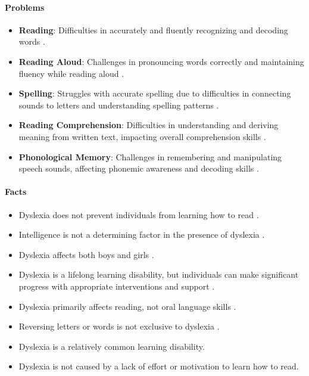 \paragraph{\textbf{Problems}}
\begin{itemize}
    \item \textbf{Reading}: Difficulties in accurately and fluently recognizing and decoding words \cite{dyslexiaCharAndSigns}.
    \item \textbf{Reading Aloud}: Challenges in pronouncing words correctly and maintaining fluency while reading aloud \cite{dyslexiaCharAndSigns}.
    \item \textbf{Spelling}: Struggles with accurate spelling due to difficulties in connecting sounds to letters and understanding spelling patterns \cite{dyslexiaCharAndSigns}.
    \item \textbf{Reading Comprehension}: Difficulties in understanding and deriving meaning from written text, impacting overall comprehension skills \cite{dyslexiaCharAndSigns}.
    \item \textbf{Phonological Memory}: Challenges in remembering and manipulating speech sounds, affecting phonemic awareness and decoding skills \cite{dyslexiaCharAndSigns}.
\end{itemize}

\paragraph{\textbf{Facts}}
\begin{itemize}
    \item Dyslexia does not prevent individuals from learning how to read \cite{dyslexiaCharAndSigns}.
    \item Intelligence is not a determining factor in the presence of dyslexia \cite{dyslexiaStatistics}. 
    \item Dyslexia affects both boys and girls \cite{dyslexiaCharAndSigns}.
    \item Dyslexia is a lifelong learning disability, but individuals can make significant progress with appropriate interventions and support \cite{dyslexiaCharAndSigns}.
    \item Dyslexia primarily affects reading, not oral language skills \cite{dyslexiaCharAndSigns}.
    \item Reversing letters or words is not exclusive to dyslexia \cite{dyslexiaCharAndSigns}.
    \item Dyslexia is a relatively common learning disability.
    \item Dyslexia is not caused by a lack of effort or motivation to learn how to read.
\end{itemize}


